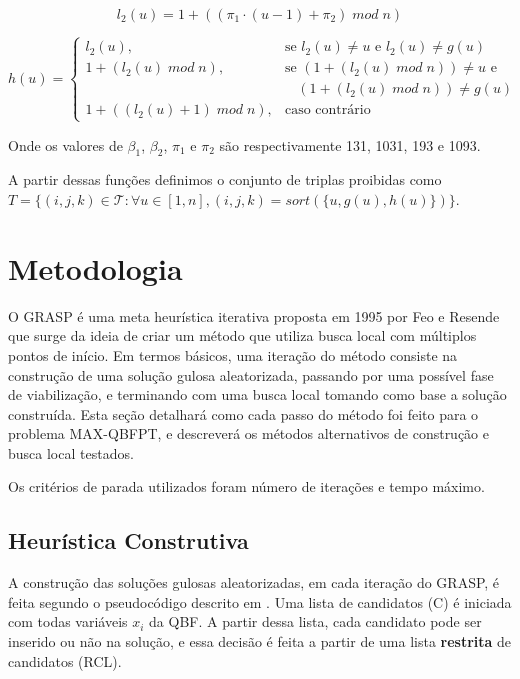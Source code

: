 \documentclass{MO824}
\begin{document}
    \begin{equation*}
    l_2(u) = 1 + ((\pi_1 \cdot (u - 1) + \pi_2 ) \; mod \; n) 
    \end{equation*}
    
    
    \begin{equation*}
    h(u) = \begin{cases} l_2(u), & \mbox{se } l_2(u) \neq u  \mbox{ e } l_2(u) \neq g(u)\\
                        1 + (l_2(u) \; mod \; n), & \mbox{se } (1+(l_2(u) \; mod \; n)) \neq u  \mbox{ e } \\ & ~~~~(1+(l_2(u) \; mod \; n)) \neq g(u)\\
                        1 + ((l_2(u)+1) \; mod \; n), & \mbox{caso contrário } \end{cases}
    \end{equation*}

    Onde os valores de $\beta_1$, $\beta_2$, $\pi_1$ e $\pi_2$ são respectivamente 131, 1031, 193 e 1093.
    
    A partir dessas funções definimos o conjunto de triplas proibidas como $T = \{(i,j,k)\in \mathcal{T} : 
    \forall u \in [1,n],  (i,j,k) = sort(\{u, g(u), h(u)\})\}$.

\section{Metodologia} \label{method}

O GRASP é uma meta heurística iterativa proposta em 1995 por Feo e Resende que surge da ideia de criar um método que utiliza busca local com múltiplos pontos de início. Em termos básicos, uma iteração do método consiste na construção de uma solução gulosa aleatorizada, passando por uma possível fase de viabilização, e terminando com uma busca local tomando como base a solução construída. Esta seção detalhará como cada passo do método foi feito para o problema MAX-QBFPT, e descreverá os métodos alternativos de construção e busca local testados.

Os critérios de parada utilizados foram número de iterações e tempo máximo. 

\subsection{Heurística Construtiva}
    A construção das soluções gulosas aleatorizadas, em cada iteração do GRASP, é feita segundo o pseudocódigo descrito em \cite{grasp}. Uma lista de candidatos (C) é iniciada com todas variáveis $x_i$ da QBF. A partir dessa lista, cada candidato pode ser inserido ou não na solução, e essa decisão é feita a partir de uma lista \textbf{restrita} de candidatos (RCL).
    
\end{document}

